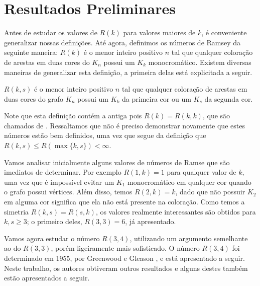 
\chapter{Resultados Preliminares}

Antes de estudar os valores de $R(k)$ para valores maiores de $k$, é conveniente generalizar nossas definições. Até agora, definimos os números de Ramsey da seguinte maneira: $R(k)$ é o menor inteiro positivo $n$ tal que qualquer coloração de arestas em duas cores do $K_n$ possui um $K_k$ monocromático. Existem diversas maneiras de generalizar esta definição, a primeira delas está explicitada a seguir.

\begin{definition}
$R(k,s)$ é o menor inteiro positivo $n$ tal que qualquer coloração de arestas em duas cores do grafo $K_n$ possui um $K_k$ da primeira cor ou um $K_s$ da segunda cor.
\end{definition}

Note que esta definição contém a antiga pois $R(k) = R(k,k)$, que são chamados de . Ressaltamos que não é preciso demonstrar novamente que estes números estão bem definidos, uma vez que segue da definição que $R(k,s) \leq R(\max\{k,s\}) < \infty$.

Vamos analisar inicialmente alguns valores de números de Ramse que são imediatos de determinar. Por exemplo $R(1,k) = 1$ para qualquer valor de $k$, uma vez que é impossível evitar um $K_1$ monocromático em qualquer cor quando o grafo possui vértices. Além disso, temos $R(2,k) = k$, dado que não possuir $K_2$ em alguma cor significa que ela não está presente na coloração. Como temos a simetria $R(k,s) = R(s,k)$, os valores realmente interessantes são obtidos para $k,s \geq 3$; o primeiro deles, $R(3,3) = 6$, já apresentado.

Vamos agora estudar o número $R(3,4)$, utilizando um argumento semelhante ao do $R(3,3)$, porém ligeiramente mais sofisticado. O número $R(3,4)$ foi determinado em 1955, por Greenwood e Gleason \cite{greenwood}, e está apresentado a seguir. Neste trabalho, os autores obtiveram outros resultados e alguns destes também estão apresentados a seguir.

